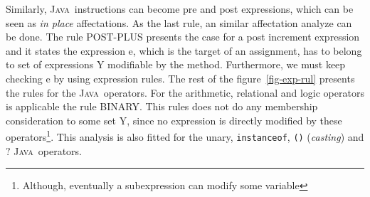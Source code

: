 \documentclass[a4paper]{llncs}
\newcommand{\java}{\textsc{Java}}
\begin{document}
Similarly, \java~instructions can become pre and post expressions,
which can be seen as \emph{in place} affectations. As the last rule,
an similar affectation analyze can be done. The rule \textup{POST-PLUS}
presents the case for a post increment expression and it states the
expression
\textup{e}, which is the target of an assignment, has to belong to
set of expressions \textup{Y} modifiable by the method. Furthermore,
we must keep checking \textup{e} by using expression rules. The rest
of the figure~\ref{fig-exp-rul} presents the
rules for the \java~operators. For the arithmetic, relational and
logic operators is applicable the rule \textup{BINARY}. This rules
does not do any membership consideration to some set \textsc{Y},
since no expression is directly modified by these
operators\footnote{Although, eventually a subexpression can modify
some variable}. This analysis is also fitted for the unary,
\texttt{instanceof}, \texttt{()} (\emph{casting}) and $?$
\java~operators.
\end{document}
